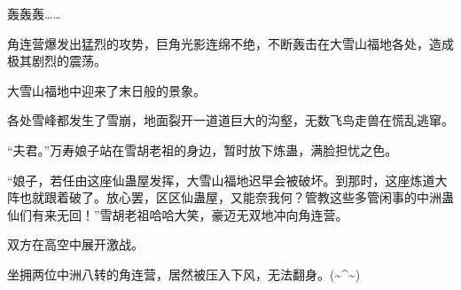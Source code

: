 \begin{this_body}
轰轰轰……

角连营爆发出猛烈的攻势，巨角光影连绵不绝，不断轰击在大雪山福地各处，造成极其剧烈的震荡。

大雪山福地中迎来了末日般的景象。

各处雪峰都发生了雪崩，地面裂开一道道巨大的沟壑，无数飞鸟走兽在慌乱逃窜。

“夫君。”万寿娘子站在雪胡老祖的身边，暂时放下炼蛊，满脸担忧之色。

“娘子，若任由这座仙蛊屋发挥，大雪山福地迟早会被破坏。到那时，这座炼道大阵也就跟着破了。放心罢，区区仙蛊屋，又能奈我何？管教这些多管闲事的中洲蛊仙们有来无回！”雪胡老祖哈哈大笑，豪迈无双地冲向角连营。

双方在高空中展开激战。

坐拥两位中洲八转的角连营，居然被压入下风，无法翻身。(\~{}\^{}\~{})

\end{this_body}


